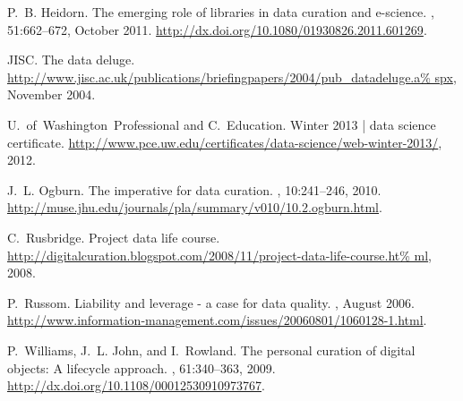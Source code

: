 \documentclass{acm_proc_article-sp}
\begin{document}
\begin{thebibliography}{10}
P.~B. Heidorn.
\newblock The emerging role of libraries in data curation and e-science.
, 51:662--672, October 2011.
\newblock \url{http://dx.doi.org/10.1080/01930826.2011.601269}.

JISC.
\newblock The data deluge.
\newblock
  \url{http://www.jisc.ac.uk/publications/briefingpapers/2004/pub_datadeluge.a%
spx}, November 2004.

U.~of~Washington~Professional and C.~Education.
\newblock Winter 2013 | data science certificate.
\newblock
  \url{http://www.pce.uw.edu/certificates/data-science/web-winter-2013/}, 2012.

J.~L. Ogburn.
\newblock The imperative for data curation.
, 10:241--246, 2010.
\newblock \url{http://muse.jhu.edu/journals/pla/summary/v010/10.2.ogburn.html}.

C.~Rusbridge.
\newblock Project data life course.
\newblock
  \url{http://digitalcuration.blogspot.com/2008/11/project-data-life-course.ht%
ml}, 2008.

P.~Russom.
\newblock Liability and leverage - a case for data quality.
, August 2006.
\newblock
  \url{http://www.information-management.com/issues/20060801/1060128-1.html}.

P.~Williams, J.~L. John, and I.~Rowland.
\newblock The personal curation of digital objects: A lifecycle approach.
, 61:340--363, 2009.
\newblock \url{http://dx.doi.org/10.1108/00012530910973767}.

\end{thebibliography}
\end{document}
